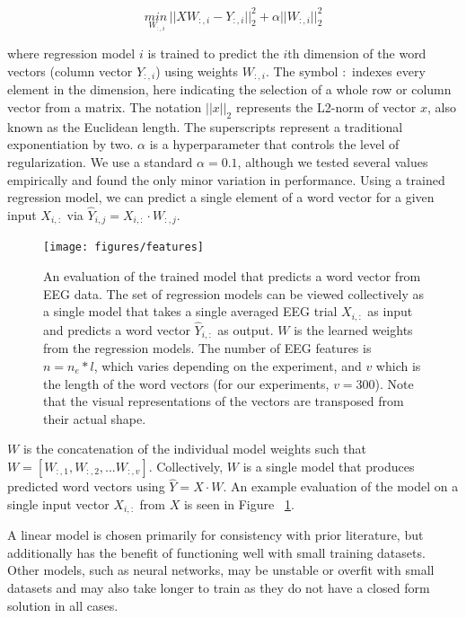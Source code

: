 \begin{equation}
  \underset{W_{:,i}}{min\,} {|| X W_{:, i} - Y_{:, i}||_2^2 + 
  \alpha ||W_{:, i}||_2^2}
  \label{eq:ridge}
\end{equation}

\noindent where regression model $i$ is trained to predict the $i$th dimension 
of the word vectors (column vector $Y_{:,i}$) using weights $W_{:,i}$. The 
symbol $:$ indexes every element in the dimension, here indicating the 
selection of a whole row or column vector from a matrix. The notation 
$||x||_2$ represents the L2-norm of vector $x$, also known as the Euclidean 
length. The superscripts represent a traditional exponentiation by two.  
$\alpha$ is a hyperparameter that controls the level of regularization.  We use 
a standard $\alpha = 0.1$, although we tested several values empirically and 
found the only minor variation in performance.  Using a trained regression 
model, we can predict a single element of a word vector for a given input 
$X_{i,:}$ via $\hat{Y}_{i,j} = X_{i, :} \cdot W_{:,j}$.

\begin{figure}[ht]
  \centering
  \texttt{[image: figures/features]}
  \caption[Evaluation of the Trained Model]{
    An evaluation of the trained model that predicts a word vector from EEG 
    data.  The set of regression models can be viewed collectively as a single 
    model that takes a single averaged EEG trial $X_{i,:}$ as input and 
    predicts a word vector $\hat{Y}_{i,:}$ as output. $W$ is the learned 
    weights from the regression models. The number of EEG features is $n = n_e 
    * l$, which varies depending on the experiment, and $v$ which is the length 
    of the word vectors (for our experiments, $v=300$). Note that the visual 
    representations of the vectors are transposed from their actual shape.
  }
  \label{fig:features}
\end{figure}

  
$W$ is the concatenation of the individual model weights such that $W = [ 
W_{:,1}, W_{:,2}, ... W_{:,v} ]$. Collectively, $W$ is a single model that 
produces predicted word vectors using $\hat{Y} = X \cdot W$. An example 
evaluation of the model on a single input vector $X_{i,:}$ from $X$ is seen in 
Figure ~\ref{fig:features}.

A linear model is chosen primarily for consistency with prior literature, but 
additionally has the benefit of functioning well with small training datasets.
Other models, such as neural networks, may be unstable or overfit with small 
datasets and may also take longer to train as they do not have a closed form 
solution in all cases.

